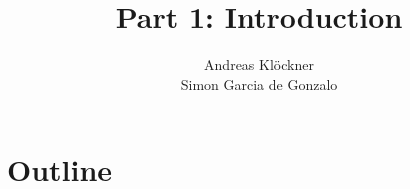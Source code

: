 \documentclass[english,compress]{beamer}
\begin{document}

\title{Part 1: Introduction}

\author{
  Andreas Klöckner\\
  Simon Garcia de Gonzalo
}


\date{}

\frame{
  \titlepage
}
\section{Outline}
\end{document}
